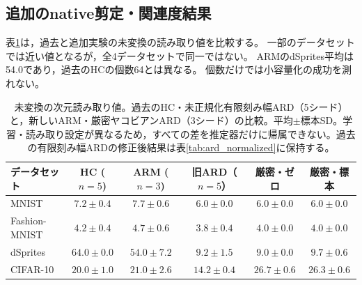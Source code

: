 \documentclass[11pt,a4paper]{ltjsarticle}
\begin{document}
\subsection{追加のnative剪定・関連度結果}\label{sec:newpruning}
表\ref{tab:newcounts}は，過去と追加実験の未変換の読み取り値を比較する。
一部のデータセットでは近い値となるが，全4データセットで同一ではない。
ARMのdSprites平均は54.0であり，過去のHCの個数64とは異なる。
個数だけでは小容量化の成功を測れない。
\begin{table}[H]
\caption{未変換の次元読み取り値。過去のHC・未正規化有限刻み幅ARD（5シード）と，新しいARM・厳密ヤコビアンARD（3シード）の比較。平均$\pm$標本SD。学習・読み取り設定が異なるため，すべての差を推定器だけに帰属できない。過去の有限刻み幅ARDの修正後結果は表\ref{tab:ard_normalized}に保持する。}\label{tab:newcounts}
\footnotesize
\setlength{\tabcolsep}{3pt}
\begin{tabular*}{\textwidth}{@{\extracolsep{\fill}}lccccc@{}}
\toprule
データセット & HC ($n=5$) & ARM ($n=3$) & 旧ARD（$n=5$） & 厳密・ゼロ & 厳密・標本 \\
\midrule
MNIST & $7.2 \pm 0.4$ & $7.7 \pm 0.6$ & $6.0 \pm 0.0$ & $6.0 \pm 0.0$ & $6.0 \pm 0.0$ \\
Fashion-MNIST & $4.2 \pm 0.4$ & $4.7 \pm 0.6$ & $3.8 \pm 0.4$ & $4.0 \pm 0.0$ & $4.0 \pm 0.0$ \\
dSprites & $64.0 \pm 0.0$ & $54.0 \pm 7.2$ & $9.2 \pm 1.5$ & $9.0 \pm 0.0$ & $9.7 \pm 0.6$ \\
CIFAR-10 & $20.0 \pm 1.0$ & $21.0 \pm 2.6$ & $14.2 \pm 0.4$ & $26.7 \pm 0.6$ & $26.3 \pm 0.6$ \\
\bottomrule\end{tabular*}
\end{table}
\end{document}
